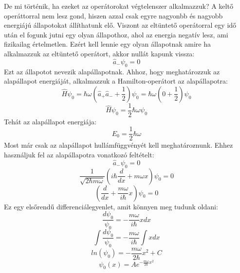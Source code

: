 \documentclass[a4paper,12pt]{article}
\begin{document}
De mi történik, ha ezeket az operátorokat végtelenszer alkalmazzuk? A keltő operáttorral nem lesz gond, hiszen azzal csak egyre nagyonbb és nagyobb
energiájú állapotokat állíthatunk elő. Viszont az eltüntető operátorral egy idő után el fogunk jutni egy olyan állapothoz, ahol az energia negatív lesz,
ami fizikailag értelmetlen. Ezért kell lennie egy olyan állapotnak amire ha alkalmazzuk az eltüntető operátort, akkor nullát kapunk vissza:
\begin{equation}
    \hat{a}_- \psi_0 = 0
\end{equation}
Ezt az állapotot nevezik alapállapotnak. Ahhoz, hogy meghatározzuk az alapállapot energiáját, alkalmazzuk a Hamilton-operátort az alapállapotra:
\begin{equation}
    \hat{H} \psi_0 = \hbar \omega \left( \hat{a}_+ \hat{a}_- + \frac{1}{2} \right) \psi_0 = \hbar \omega \left( 0 + \frac{1}{2} \right) \psi_0
\end{equation}
\begin{equation}
    \hat{H} \psi_0 = \frac{1}{2} \hbar \omega \psi_0
\end{equation}
Tehát az alapállapot energiája:
\begin{equation}
    E_0 = \frac{1}{2} \hbar \omega
\end{equation}
Most már csak az alapállapot hullámfüggvényét kell meghatároznunk. Ehhez használjuk fel az alapállapotra vonatkozó feltételt:
\begin{equation}
    \hat{a}_- \psi_0 = 0
\end{equation}
\begin{equation}
    \frac{1}{\sqrt{2 \hbar m \omega}} \left( i \hbar \frac{d}{dx} + m \omega x \right) \psi_0 = 0
\end{equation}
\begin{equation}
    \left( \frac{d}{dx} + \frac{m \omega}{i \hbar} x \right) \psi_0 = 0
\end{equation}
Ez egy elsőrendű differenciálegyenlet, amit könnyen meg tudunk oldani:
\begin{equation}
    \frac{d \psi_0}{\psi_0} = - \frac{m \omega}{i \hbar} x dx
\end{equation}
\begin{equation}
    \int \frac{d \psi_0}{\psi_0} = - \frac{m \omega}{i \hbar} \int x dx
\end{equation}
\begin{equation}
    ln(\psi_0) = - \frac{m \omega}{2 \hbar} x^2 + C
\end{equation}
\begin{equation}
    \psi_0(x) = A e^{- \frac{m \omega}{2 \hbar} x^2}
\end{equation}
\end{document}
